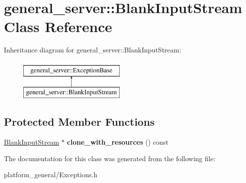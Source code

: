 \hypertarget{classgeneral__server_1_1BlankInputStream}{\section{general\-\_\-server\-:\-:\-Blank\-Input\-Stream \-Class \-Reference}
\label{classgeneral__server_1_1BlankInputStream}
}
\-Inheritance diagram for general\-\_\-server\-:\-:\-Blank\-Input\-Stream\-:\begin{figure}[H]
\begin{center}
\leavevmode
\includegraphics[height=2.000000cm]{classgeneral__server_1_1BlankInputStream}
\end{center}
\end{figure}
\subsection*{\-Protected \-Member \-Functions}
\begin{DoxyCompactItemize}
\item 
\hypertarget{classgeneral__server_1_1BlankInputStream_ab4eda7bc6599de59bb30c1e291095009}{\hyperlink{classgeneral__server_1_1BlankInputStream}{\-Blank\-Input\-Stream} $\ast$ {\bfseries clone\-\_\-with\-\_\-resources} () const }\label{classgeneral__server_1_1BlankInputStream_ab4eda7bc6599de59bb30c1e291095009}

\end{DoxyCompactItemize}


\-The documentation for this class was generated from the following file\-:\begin{DoxyCompactItemize}
\item 
platform\-\_\-general/\-Exceptions.\-h\end{DoxyCompactItemize}
